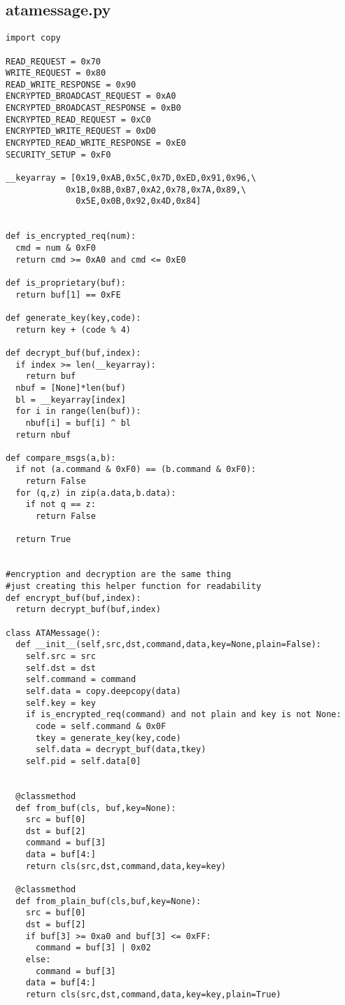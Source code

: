\begin{appendices}
\subsection{atamessage.py}
\begin{verbatim}
import copy

READ_REQUEST = 0x70
WRITE_REQUEST = 0x80
READ_WRITE_RESPONSE = 0x90
ENCRYPTED_BROADCAST_REQUEST = 0xA0
ENCRYPTED_BROADCAST_RESPONSE = 0xB0
ENCRYPTED_READ_REQUEST = 0xC0
ENCRYPTED_WRITE_REQUEST = 0xD0
ENCRYPTED_READ_WRITE_RESPONSE = 0xE0
SECURITY_SETUP = 0xF0

__keyarray = [0x19,0xAB,0x5C,0x7D,0xED,0x91,0x96,\
            0x1B,0x8B,0xB7,0xA2,0x78,0x7A,0x89,\
              0x5E,0x0B,0x92,0x4D,0x84]


def is_encrypted_req(num):
  cmd = num & 0xF0
  return cmd >= 0xA0 and cmd <= 0xE0

def is_proprietary(buf):
  return buf[1] == 0xFE

def generate_key(key,code):
  return key + (code % 4)

def decrypt_buf(buf,index):
  if index >= len(__keyarray):
    return buf
  nbuf = [None]*len(buf)
  bl = __keyarray[index]
  for i in range(len(buf)):
    nbuf[i] = buf[i] ^ bl
  return nbuf

def compare_msgs(a,b):
  if not (a.command & 0xF0) == (b.command & 0xF0):
    return False
  for (q,z) in zip(a.data,b.data):
    if not q == z:
      return False

  return True


#encryption and decryption are the same thing
#just creating this helper function for readability
def encrypt_buf(buf,index):
  return decrypt_buf(buf,index)

class ATAMessage():
  def __init__(self,src,dst,command,data,key=None,plain=False):
    self.src = src
    self.dst = dst
    self.command = command
    self.data = copy.deepcopy(data)
    self.key = key
    if is_encrypted_req(command) and not plain and key is not None:
      code = self.command & 0x0F
      tkey = generate_key(key,code)
      self.data = decrypt_buf(data,tkey)
    self.pid = self.data[0]


  @classmethod
  def from_buf(cls, buf,key=None):
    src = buf[0]
    dst = buf[2]
    command = buf[3]
    data = buf[4:]
    return cls(src,dst,command,data,key=key)

  @classmethod
  def from_plain_buf(cls,buf,key=None):
    src = buf[0]
    dst = buf[2]
    if buf[3] >= 0xa0 and buf[3] <= 0xFF:
      command = buf[3] | 0x02
    else:
      command = buf[3]
    data = buf[4:]
    return cls(src,dst,command,data,key=key,plain=True)


\end{verbatim}
\end{appendices}
